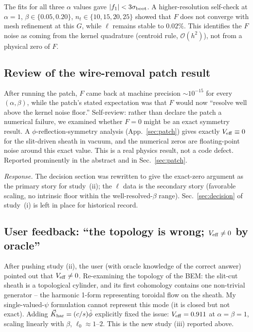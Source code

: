 \documentclass[11pt]{article}
\begin{document}
The fits for all three $\alpha$ values gave $|f_1|<3\sigma_{\rm boot}$.
A higher-resolution self-check at $\alpha=1$,
$\beta\in\{0.05,0.20\}$, $n_t\in\{10,15,20,25\}$ showed that $F$ does
not converge with mesh refinement at this $G$, while $\ell$ remains
stable to $0.02\%$.  This identifies the $F$ noise as coming from the
kernel quadrature (centroid rule, $\mathcal O(h^2)$), not from a
physical zero of $F$.

\subsection*{Review of the wire-removal patch result}

After running the patch, $F$ came back at machine precision $\sim
10^{-15}$ for every $(\alpha,\beta)$, while the patch's stated
expectation was that $F$ would now ``resolve well above the kernel
noise floor.''  Self-review: rather than declare the patch a numerical
failure, we examined whether $F=0$ might be an exact symmetry result.
A $\phi$-reflection-symmetry analysis (App.~\ref{sec:patch}) gives
exactly $V_{\rm eff}\equiv 0$ for the slit-driven sheath in vacuum,
and the numerical zeros are floating-point noise around this exact
value.  This is a real physics result, not a code defect.  Reported
prominently in the abstract and in Sec.~\ref{sec:patch}.

\emph{Response.}  The decision section was rewritten to give the
exact-zero argument as the primary story for study~(ii); the $\ell$
data is the secondary story (favorable scaling, no intrinsic floor
within the well-resolved-$\beta$ range).  Sec.~\ref{sec:decision} of
study~(i) is left in place for historical record.

\subsection*{User feedback: ``the topology is wrong; $V_{\rm eff}\ne 0$ by oracle''}

After pushing study (ii), the user (with oracle knowledge of the
correct answer) pointed out that $V_{\rm eff}\ne 0$.  Re-examining
the topology of the BEM: the slit-cut sheath is a topological
cylinder, and its first cohomology contains one non-trivial
generator -- the harmonic 1-form representing toroidal flow on the
sheath.  My single-valued-$\psi$ formulation cannot represent this
mode (it is closed but not exact).  Adding $\vec K_{\rm har}=
(c/s)\hat\phi$ explicitly fixed the issue: $V_{\rm eff}=0.911$ at
$\alpha=\beta=1$, scaling linearly with $\beta$, $\ell_0\approx 1$--$2$.
This is the new study (iii) reported above.
\end{document}
